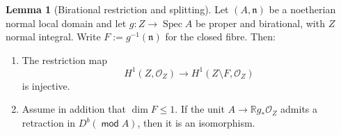 \documentclass[a4paper,reqno]{amsart}
\def\O{\mathcal{O}}
\DeclareMathOperator{\md}{\mathsf{mod}}
\renewcommand{\mod}{\md}
\DeclareMathOperator{\Spec}{Spec}
\theoremstyle{definition}
\newtheorem{Lem}[Thm]{Lemma}
\begin{document}
\begin{Lem}[Birational restriction and splitting]\label{lem:birational-split-unit}
Let $(A,\mathfrak n)$ be a noetherian normal local domain and let $g\colon Z\to\Spec A$ be proper and birational, with $Z$ normal integral. Write $F:=g^{-1}(\mathfrak n)$ for the closed fibre. Then:
\begin{enumerate}
\item The restriction map
\begin{equation}\label{eq:birational-h1-injectivity}
H^1(Z,\O_Z)\longrightarrow H^1(Z\setminus F,\O_Z)
\end{equation}
is injective.
\item Assume in addition that $\dim F\le1$. If the unit $A\to\mathbb Rg_*\O_Z$ admits a retraction in $D^b(\mod A)$, then it is an isomorphism.
\end{enumerate}
\end{Lem}
\end{document}
